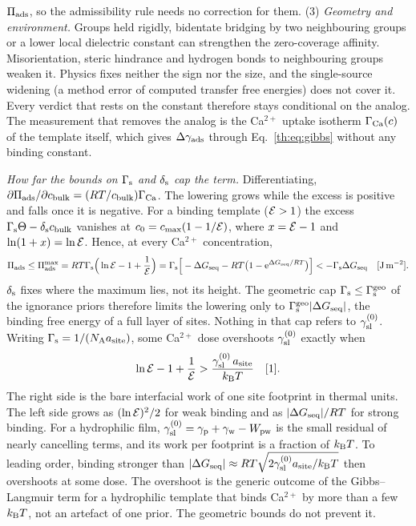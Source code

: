 $\Pi_\mathrm{ads}$, so the admissibility rule needs no correction for them.
(3) \emph{Geometry and environment.} Groups held rigidly, bidentate bridging by two neighbouring
groups or a lower local dielectric constant can strengthen the zero-coverage affinity. Misorientation,
steric hindrance and hydrogen bonds to neighbouring groups weaken it. Physics fixes neither the sign nor
the size, and the single-source widening (a method error of computed transfer free energies) does not
cover it. Every verdict that rests on the constant therefore stays conditional on the analog. The
measurement that removes the analog is the Ca$^{2+}$ uptake isotherm $\Gamma_\mathrm{Ca}(c)$ of the template itself,
which gives $\Delta\gamma_\mathrm{ads}$ through Eq.~\eqref{th:eq:gibbs} without any binding constant.

\emph{How far the bounds on $\Gamma_\mathrm{s}$ and $\delta_\mathrm{s}$ cap the term.} Differentiating,
$\partial\Pi_\mathrm{ads}/\partial c_\mathrm{bulk}=(R T/c_\mathrm{bulk})\Gamma_\mathrm{Ca}$. The lowering grows while the excess is positive and
falls once it is negative. For a binding template ($\mathcal{E}>1$) the excess $\Gamma_\mathrm{s}\Theta-\delta_\mathrm{s}c_\mathrm{bulk}$ vanishes
at $c_0=c_\mathrm{max}(1-1/\mathcal{E})$, where $x=\mathcal{E}-1$ and $\ln(1+x)=\ln\mathcal{E}$. Hence, at every Ca$^{2+}$
concentration,
\begin{equation}\label{th:eq:pimax}
\Pi_\mathrm{ads}\le\Pi_\mathrm{ads}^{\max}=R T\Gamma_\mathrm{s}\Big(\ln\mathcal{E}-1+\frac{1}{\mathcal{E}}\Big)=\Gamma_\mathrm{s}\Big[-\Delta G_\mathrm{seq}-R T\big(1-\mathrm{e}^{\Delta G_\mathrm{seq}/R T}\big)\Big]<-\Gamma_\mathrm{s}\Delta G_\mathrm{seq} \quad[\mathrm{J\,m^{-2}}].
\end{equation}
$\delta_\mathrm{s}$ fixes where the maximum lies, not its height. The geometric cap
$\Gamma_\mathrm{s}\le\Gamma_\mathrm{s}^\mathrm{geo}$ of the ignorance priors therefore limits the lowering only to
$\Gamma_\mathrm{s}^\mathrm{geo}|\Delta G_\mathrm{seq}|$, the binding free energy of a full layer of sites. Nothing in that
cap refers to $\gamma_\mathrm{sl}^{(0)}$. Writing $\Gamma_\mathrm{s}=1/(N_\mathrm{A} a_\mathrm{site})$, some Ca$^{2+}$ dose overshoots $\gamma_\mathrm{sl}^{(0)}$
exactly when
\begin{equation}\label{th:eq:overshoot}
\ln\mathcal{E}-1+\frac{1}{\mathcal{E}}>\frac{\gamma_\mathrm{sl}^{(0)}\,a_\mathrm{site}}{k_\mathrm{B} T} \quad[\mathrm{1}].
\end{equation}
The right side is the bare interfacial work of one site footprint in thermal units. The left side grows
as $(\ln\mathcal{E})^{2}/2$ for weak binding and as $|\Delta G_\mathrm{seq}|/R T$ for strong binding. For a hydrophilic film,
$\gamma_\mathrm{sl}^{(0)}=\gamma_\mathrm{p}+\gamma_\mathrm{w}-W_\mathrm{pw}$ is the small residual of nearly cancelling terms, and its work per footprint
is a fraction of $k_\mathrm{B} T$. To leading order, binding stronger than
$|\Delta G_\mathrm{seq}|\approx R T\sqrt{2\gamma_\mathrm{sl}^{(0)} a_\mathrm{site}/k_\mathrm{B} T}$ then overshoots at some dose. The overshoot
is the generic outcome of the Gibbs--Langmuir term for a hydrophilic template that binds Ca$^{2+}$ by
more than a few $k_\mathrm{B} T$, not an artefact of one prior. The geometric bounds do not prevent it.

